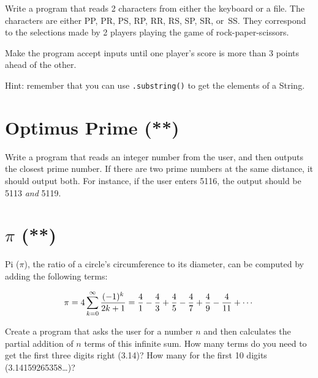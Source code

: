 \documentclass{article}
\begin{document}
Write a program that reads 2 characters from either the keyboard or a
file. The characters are either PP, PR, PS, RP, RR, RS, SP, SR,
or~SS. They correspond to the selections made by 2 players playing the 
game of rock-paper-scissors. 

Make the program accept inputs until one player's score is more than 3
points ahead of the other. 

Hint: remember that you can use \verb+.substring()+ to get the
elements of a String. 

\section{Optimus Prime (**)}
\label{sec:optimus-prime}

Write a program that reads an integer number from the user, and then
outputs the closest prime number. If there are two prime numbers at
the same distance, it should output both. For instance, if the user
enters 5116, the output should be 5113 \emph{and} 5119. 

\section{$\pi$ (**)}
\label{sec:pi-}

Pi ($\pi$), the ratio of a circle's circumference to its diameter, 
can be computed by adding the following terms: 

$$ \pi = 4 \sum^{\infty}_{k=0} {(-1)^k \over 2k+1} = 
  {4 \over 1} - {4 \over 3} + {4 \over 5} - {4 \over 7} 
  + {4 \over 9} - {4 \over 11} + \cdots $$

Create a program that asks the user for a number $n$ and then
calculates the partial addition of $n$ terms of this infinite sum. 
How many terms do you need to get
the first three digits right (3.14)? How many for the first 10 digits
(3.14159265358\ldots)?
\end{document}
